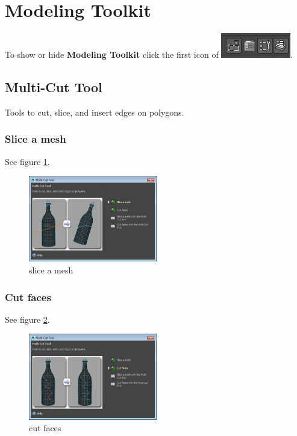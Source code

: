 \section{Modeling Toolkit}
To show or hide \textbf{Modeling Toolkit} click the first icon of \includegraphics{"figures/Modeling Toolkit"}.

\subsection{Multi-Cut Tool}
Tools to cut, slice, and insert edges on polygons.

\subsubsection{Slice a mesh}
See figure \ref{fig: slice a mesh}.
\begin{figure}[h]
	\centering
	\includegraphics[width=0.5\textwidth]{"figures/slice a mesh"}
	\caption{slice a mesh}\label{fig: slice a mesh}
\end{figure}

\subsubsection{Cut faces}
See figure \ref{fig: cut faces}.
\begin{figure}[h]
	\centering
	\includegraphics[width=0.5\textwidth]{"figures/cut faces"}
	\caption{cut faces}\label{fig: cut faces}
\end{figure}


